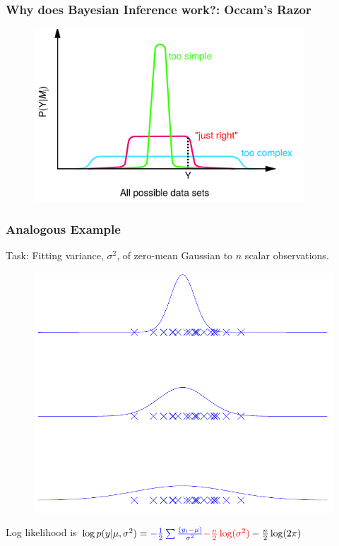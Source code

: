 \documentclass[10pt]{beamer}
\begin{document}
  \begin{frame}
    \frametitle{Why does Bayesian Inference work?: Occam's Razor}

    \begin{figure}
      \centering
      \includegraphics[width=0.9\textwidth]{occamsRazor.png}
    \end{figure}
  \end{frame}

  \begin{frame}
    \frametitle{Analogous Example}

    Task: Fitting variance, $\sigma^2$, of zero-mean Gaussian to $n$ scalar observations.

    \begin{figure}
      \centering
      \includegraphics[height=0.6\textheight]{occamsRazor2.png}
    \end{figure}

    Log likelihood is $\log p(y|\mu,\sigma^2) = \textcolor{blue}{- \frac{1}{2} \sum \frac{(y_i - \mu)}{\sigma^2}} \textcolor{red}{- \frac{n}{2} \log(\sigma^2)} - \frac{n}{2} \log(2\pi)$
  \end{frame}
\end{document}

